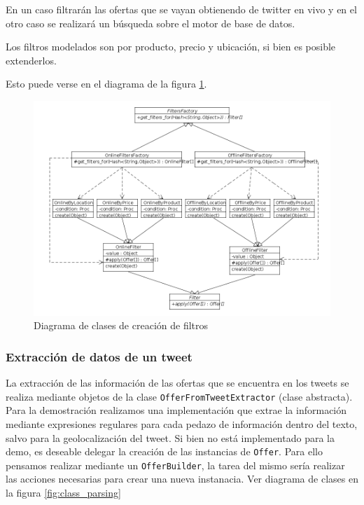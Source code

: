 En un caso filtrar\'an las ofertas que se vayan obtienendo de twitter en vivo y en el otro caso se realizar\'a un b\'usqueda sobre el motor de base de datos.

Los filtros modelados son por producto, precio y ubicaci\'on, si bien es posible extenderlos.

Esto puede verse en el diagrama de la figura \ref{fig:class_filter_factory}. 

\begin{figure}[h]
\centerline{\includegraphics[width=0.6\paperwidth]{./imgs/class_diagram_filters_factory.png}}
\caption{Diagrama de clases de creaci\'on de filtros}
\label{fig:class_filter_factory} 
\end{figure}

\subsubsection{Extracci\'on de datos de un tweet}
La extracci\'on de las informaci\'on de las ofertas que se encuentra en los tweets se realiza mediante objetos de la clase \texttt{OfferFromTweetExtractor} (clase abstracta).
Para la demostraci\'on realizamos una implementaci\'on que extrae la informaci\'on mediante expresiones regulares para cada pedazo de informaci\'on dentro del texto, salvo para la geolocalizaci\'on del tweet.
Si bien no est\'a implementado para la demo, es deseable delegar la creaci\'on de las instancias de \texttt{Offer}. Para ello pensamos realizar mediante un \texttt{OfferBuilder}, la tarea del mismo ser\'ia realizar las acciones necesarias para crear una nueva instanacia. Ver diagrama de clases en la figura \ref{fig:class_parsing}


